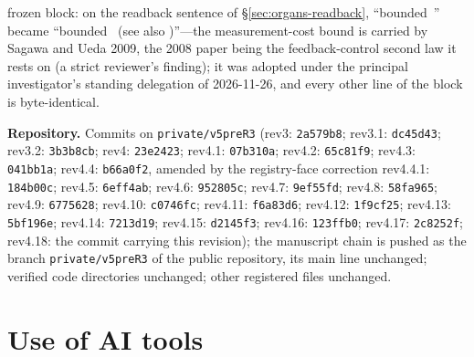 \documentclass[11pt,a4paper]{article}
\begin{document}
frozen block: on the readback sentence of \S\ref{sec:organs-readback}, ``bounded~\cite{sagawa2008,sagawa2009}'' became ``bounded~\cite{sagawa2009} (see also \cite{sagawa2008})''---the measurement-cost bound is carried by Sagawa and Ueda 2009, the 2008 paper being the feedback-control second law it rests on (a strict reviewer's finding); it was adopted under the principal investigator's standing delegation of 2026-11-26, and every other line of the block is byte-identical.

\textbf{Repository.} Commits on \texttt{private/v5preR3} (rev3: \texttt{2a579b8}; rev3.1: \texttt{dc45d43}; rev3.2: \texttt{3b3b8cb}; rev4: \texttt{23e2423}; rev4.1: \texttt{07b310a}; rev4.2: \texttt{65c81f9}; rev4.3: \texttt{041bb1a}; rev4.4: \texttt{b66a0f2}, amended by the registry-face correction rev4.4.1: \texttt{184b00c}; rev4.5: \texttt{6eff4ab}; rev4.6: \texttt{952805c}; rev4.7: \texttt{9ef55fd}; rev4.8: \texttt{58fa965}; rev4.9: \texttt{6775628}; rev4.10: \texttt{c0746fc}; rev4.11: \texttt{f6a83d6}; rev4.12: \texttt{1f9cf25}; rev4.13: \texttt{5bf196e}; rev4.14: \texttt{7213d19}; rev4.15: \texttt{d2145f3}; rev4.16: \texttt{123ffb0}; rev4.17: \texttt{2c8252f}; rev4.18: the commit carrying this revision); the manuscript chain is pushed as the branch \texttt{private/}\allowbreak\texttt{v5preR3} of the public repository, its main line unchanged; verified code directories unchanged; other registered files unchanged.

\section*{Use of AI tools}
\label{sec:ai-disclosure}
\end{document}
